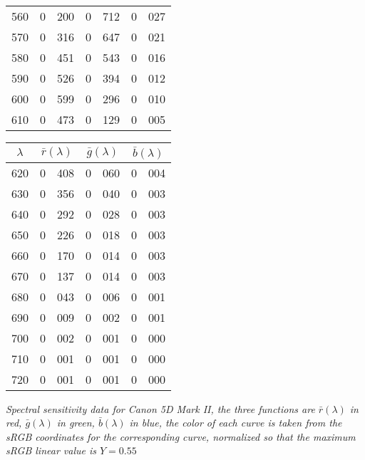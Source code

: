 {{\begin{minipage}{.3\textwidth}
\begin{tabular}{c|r@{.}l | r@{.}l | r@{.}l}
 560 &   0&200 &   0&712 &   0&027 \\
 570 &   0&316 &   0&647 &   0&021 \\
 580 &   0&451 &   0&543 &   0&016 \\
 590 &   0&526 &   0&394 &   0&012 \\
 600 &   0&599 &   0&296 &   0&010 \\
 610 &   0&473 &   0&129 &   0&005 \\
\end{tabular}
\end{minipage}\hfill
\begin{minipage}{.3\textwidth}
\centering
\begin{tabular}{c|r@{.}l | r@{.}l | r@{.}l}
$\lambda$ & \multicolumn{2}{c|}{$\bar r(\lambda)$} &  \multicolumn{2}{c|}{$\bar g(\lambda)$} &  \multicolumn{2}{c}{$\bar b(\lambda)$} \\
\hline
 620 &   0&408 &   0&060 &   0&004 \\
 630 &   0&356 &   0&040 &   0&003 \\
 640 &   0&292 &   0&028 &   0&003 \\
 650 &   0&226 &   0&018 &   0&003 \\
 660 &   0&170 &   0&014 &   0&003 \\
 670 &   0&137 &   0&014 &   0&003 \\
 680 &   0&043 &   0&006 &   0&001 \\
 690 &   0&009 &   0&002 &   0&001 \\
 700 &   0&002 &   0&001 &   0&000 \\
 710 &   0&001 &   0&001 &   0&000 \\
 720 &   0&001 &   0&001 &   0&000 \\
\end{tabular}
\end{minipage}
\vskip 1mm
}
\centering
{\footnotesize\it Spectral sensitivity data for Canon 5D Mark II, the three
functions
are $\bar r(\lambda)$ in red, $\bar g(\lambda)$ in green, $\bar b(\lambda)$ in blue,
the color of each curve is taken from the \gls{sRGB} coordinates for the
corresponding
curve, normalized so that the maximum \gls{sRGB} linear value is $Y = 0.55$
}
\label{tab:canon5dmii}
}


